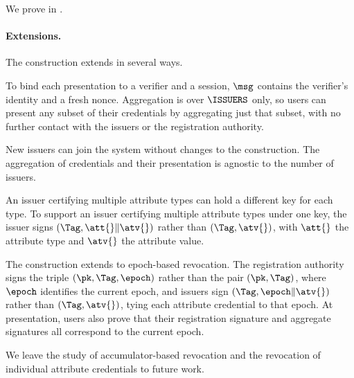 We prove  in .


\paragraph{Extensions.} The construction extends in several ways.

To bind each presentation to a verifier and a session, $\msg$ contains the
verifier's identity and a fresh nonce. Aggregation is over $\ISSUERS$ only, so
users can present any subset of their credentials by aggregating just that
subset, with no further contact with the issuers or the registration authority.

New issuers can join the system without changes to the construction. The
aggregation of credentials and their presentation is agnostic to the number of
issuers.

An issuer certifying multiple attribute types can hold a different key for each
type. To support an issuer certifying multiple attribute types under one key,
the issuer signs $(\Tag, \att{} \| \atv{})$ rather than $(\Tag,
\atv{})$, with $\att{}$ the attribute type and $\atv{}$ the attribute value.

The construction extends to epoch-based revocation. The registration authority
signs the triple $(\pk, \Tag, \epoch)$ rather than the pair $(\pk, \Tag)$, where
$\epoch$ identifies the current epoch, and issuers sign $(\Tag, \epoch \|
\atv{})$ rather than $(\Tag, \atv{})$, tying each attribute credential to that
epoch. At presentation, users also prove that their registration
signature and aggregate signatures all correspond to the current epoch.

We leave the study of accumulator-based revocation and the revocation of
individual attribute credentials to future work.
